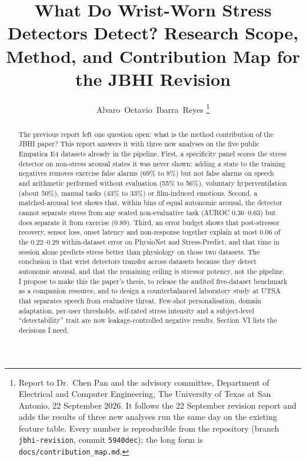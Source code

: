 \documentclass[journal]{IEEEtran}
\begin{document}
\title{What Do Wrist-Worn Stress Detectors Detect? Research Scope, Method, and Contribution Map for the JBHI Revision}

\author{Alvaro~Octavio~Ibarra~Reyes%
\thanks{Report to Dr.~Chen Pan and the advisory committee, Department of Electrical and Computer Engineering, The University of Texas at San Antonio, 22 September 2026. It follows the 22 September revision report and adds the results of three new analyses run the same day on the existing feature table. Every number is reproducible from the repository (branch \texttt{jbhi-revision}, commit \texttt{5940dec}); the long form is \texttt{docs/contribution\_map.md}.}}


\maketitle

\begin{abstract}
The previous report left one question open: what is the method contribution of the JBHI paper? This report answers it with three new analyses on the five public Empatica E4 datasets already in the pipeline. First, a specificity panel scores the stress detector on non-stress arousal states it was never shown: adding a state to the training negatives removes exercise false alarms (69\% to 8\%) but not false alarms on speech and arithmetic performed without evaluation (55\% to 56\%), voluntary hyperventilation (about 50\%), manual tasks (43\% to 33\%) or film-induced emotions. Second, a matched-arousal test shows that, within bins of equal autonomic arousal, the detector cannot separate stress from any seated non-evaluative task (AUROC 0.36--0.63) but does separate it from exercise (0.89). Third, an error budget shows that post-stressor recovery, sensor loss, onset latency and non-response together explain at most 0.06 of the 0.22--0.29 within-dataset error on PhysioNet and Stress-Predict, and that time in session alone predicts stress better than physiology on those two datasets. The conclusion is that wrist detectors transfer across datasets because they detect autonomic arousal, and that the remaining ceiling is stressor potency, not the pipeline. I propose to make this the paper's thesis, to release the audited five-dataset benchmark as a companion resource, and to design a counterbalanced laboratory study at UTSA that separates speech from evaluative threat. Few-shot personalisation, domain adaptation, per-user thresholds, self-rated stress intensity and a subject-level ``detectability'' trait are now leakage-controlled negative results. Section~VI lists the decisions I need.
\end{abstract}
\end{document}
